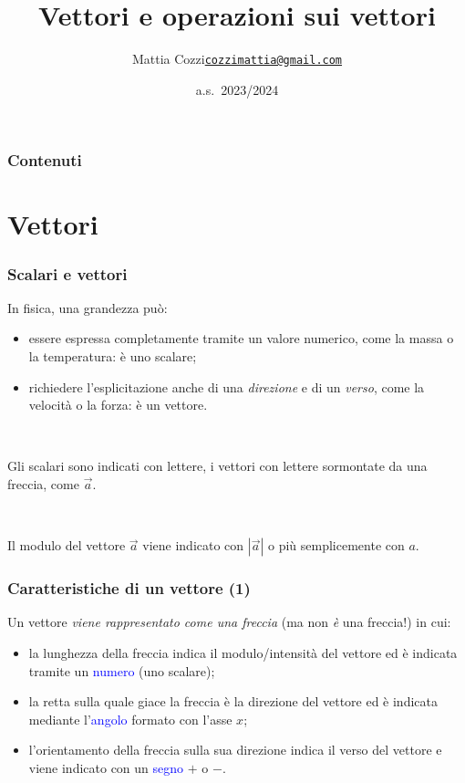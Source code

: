 \documentclass[]{beamer}
\title{Vettori e operazioni sui vettori}
\author{\texorpdfstring{Mattia Cozzi\newline\href{mailto:cozzimattia@gmail.com}{\texttt{cozzimattia@gmail.com}}}{Mattia Cozzi}}
\date{a.s.~2023/2024}
\theoremstyle{plain}
\begin{document}
\begin{frame}
  \titlepage
\end{frame}





\begin{frame}
\frametitle{Contenuti}
\tableofcontents
\end{frame}


\section{Vettori}


\begin{frame}
  \frametitle{Scalari e vettori}
  In fisica, una grandezza può:
\begin{itemize}
  \item essere espressa completamente tramite un valore numerico, come la massa o la temperatura: è uno \alert<1,3>{scalare};\pause
  \item richiedere l'esplicitazione anche di una \emph{direzione} e di un \emph{verso}, come la velocità o la forza: è un \alert<2-3>{vettore}.\pause
\end{itemize}

~

  Gli scalari sono indicati con lettere, i vettori con lettere sormontate da una freccia, come $ \vec{a} $.\pause
  
  ~
  
  Il modulo del vettore $ \vec{a} $ viene indicato con $ |\vec{a}| $ o più semplicemente con $ a $.
\end{frame}

\begin{frame}
\frametitle{Caratteristiche di un vettore (1)}
  Un vettore \emph{viene rappresentato come una freccia} (ma non \emph{è} una freccia!) in cui:
  \begin{itemize}
    \item la lunghezza della freccia indica il \alert{modulo/intensità} del vettore ed è indicata tramite un \textcolor{blue}{numero} (uno scalare);\pause
    \item la retta sulla quale giace la freccia è la \alert{direzione} del vettore ed è indicata mediante l'\textcolor{blue}{angolo} formato con l'asse $ x $;\pause
    \item l'orientamento della freccia sulla sua direzione indica il \alert{verso} del vettore e viene indicato con un \textcolor{blue}{segno} $ + $ o $ - $. 
  \end{itemize}
\end{frame}
\end{document}
